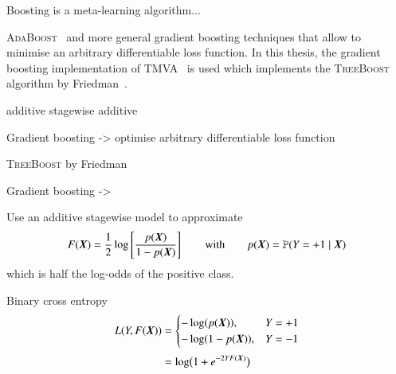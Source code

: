 Boosting is a meta-learning algorithm...


\textsc{AdaBoost}~\cite{freund_shapire:adaboost,freund_shapire:adaboost2} and
more general gradient boosting techniques that allow to minimise an arbitrary
differentiable loss function.  In this thesis, the gradient boosting
implementation of TMVA~\cite{TMVA} is used which implements the
\textsc{TreeBoost} algorithm by Friedman~\cite{Friedman:2001wbq}.







additive stagewise additive



Gradient boosting -> optimise arbitrary differentiable loss function


\textsc{TreeBoost} by Friedman~\cite{Friedman:2000,Friedman:2001wbq}


Gradient boosting ->




Use an additive stagewise model to approximate
\begin{align*}
  F(\myvec{X}) = \frac{1}{2} \log\left[ \frac{p(\myvec{X})}{1 - p(\myvec{X})} \right] \qquad \text{with} \qquad p(\myvec{X}) = \mathbb{P}(Y = +1 \mid \myvec{X})
\end{align*}
which is half the log-odds of the positive class.


Binary cross entropy
\begin{align*}
  L(Y, F(\myvec{X})) &=
  \begin{cases}
    - \log( p(\myvec{X}) ), & Y = +1 \\
    - \log( 1 - p(\myvec{X}) ), & Y = -1
  \end{cases} \\[0.3em]
                     &= \log\bigl( 1 + e^{-2 Y F(\myvec{X})} \bigr)
\end{align*}


